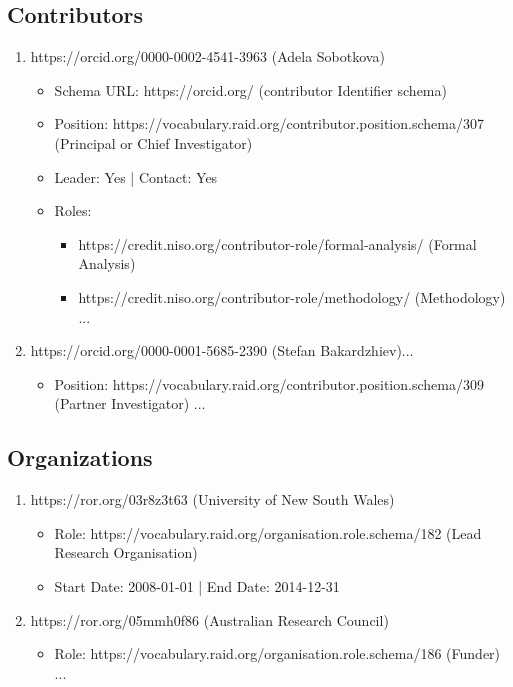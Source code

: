 \documentclass[a0,portrait]{a0poster}
\begin{document}
\begin{multicols}{2}
\begin{tiny}
\subsection*{Contributors}
\begin{enumerate}

\item https://orcid.org/0000-0002-4541-3963 (Adela Sobotkova)
   \begin{itemize}
   \item Schema URL: https://orcid.org/ (contributor Identifier schema)
   \item Position: https://vocabulary.raid.org/contributor.position.schema/307 (Principal or Chief Investigator)
   \item Leader: Yes | Contact: Yes
   \item Roles:
   \begin{itemize}
   \item https://credit.niso.org/contributor-role/formal-analysis/ (Formal Analysis)
   \item https://credit.niso.org/contributor-role/methodology/ (Methodology) ...
   \end{itemize}
   \end{itemize}

\item https://orcid.org/0000-0001-5685-2390 (Stefan Bakardzhiev)...
   \begin{itemize}
   \item Position: https://vocabulary.raid.org/contributor.position.schema/309 (Partner Investigator) ...
   \end{itemize}
\end{enumerate}

\subsection*{Organizations}
\begin{enumerate}
\item https://ror.org/03r8z3t63 (University of New South Wales)
   \begin{itemize}
   \item Role: https://vocabulary.raid.org/organisation.role.schema/182 (Lead Research Organisation)
   \item Start Date: 2008-01-01 | End Date: 2014-12-31
   \end{itemize}

\item https://ror.org/05mmh0f86 (Australian Research Council)
   \begin{itemize}
   \item Role: https://vocabulary.raid.org/organisation.role.schema/186 (Funder) ...
   \end{itemize}
\end{enumerate}


\end{tiny}
\end{multicols}
\end{document}
